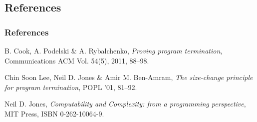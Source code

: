 \begin{frame}

\section{References}

\frametitle{References}

\begin{thebibliography}{2}

 B. Cook, A. Podelski \& A.  Rybalchenko,
\emph{Proving program termination}, Communications ACM Vol. 54(5), 2011,
88--98.

 Chin Soon Lee, Neil D. Jones \& Amir
M. Ben-Amram, \emph{The size-change principle for program termination}, POPL
'01, 81--92.

 Neil D. Jones, \emph{Computability and Complexity:
from a programming perspective}, MIT Press, ISBN 0-262-10064-9.

\end{thebibliography}

\end{frame}
